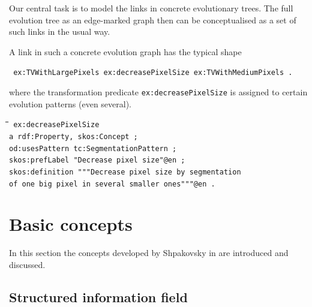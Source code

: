 \documentclass[11pt,a4paper]{article}
\newenvironment{code}{\tt \begin{tabbing}
\hskip12pt\=\hskip12pt\=\hskip12pt\=\hskip12pt\=\hskip5cm\=\hskip5cm\=\kill}
{\end{tabbing}}
\begin{document}
Our central task is to model the links in concrete evolutionary trees. The
full evolution tree as an edge-marked graph then can be conceptualised as a
set of such links in the usual way.

A link in such a concrete evolution graph has the typical shape
\begin{center}\tt
  ex:TVWithLargePixels ex:decreasePixelSize ex:TVWithMediumPixels .
\end{center}
where the transformation predicate \texttt{ex:decreasePixelSize} is assigned
to certain evolution patterns (even several).
\begin{code}\tt
ex:decreasePixelSize \\
\> a rdf:Property, skos:Concept ; \\
\> od:usesPattern tc:SegmentationPattern ; \\
\> skos:prefLabel "Decrease pixel size"@en ; \\
\> skos:definition """Decrease pixel size by segmentation \\
\>\> of one big pixel in several smaller ones"""@en .
\end{code}

\section{Basic concepts}

In this section the concepts developed by Shpakovsky in \cite{Shpakovsky2016} are introduced and discussed.

\subsection{Structured information field}
\end{document}
